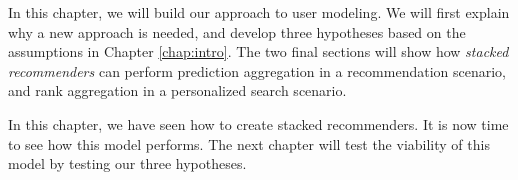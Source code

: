 \label{chap:methods}

In this chapter, we will build our approach to user modeling.
We will first explain why a new approach is needed,
and develop three hypotheses based on the 
assumptions in Chapter \ref{chap:intro}.
The two final sections will show how \emph{stacked recommenders}
can perform prediction aggregation in a recommendation scenario,
and rank aggregation in a personalized search scenario.







\hr

\noindent
In this chapter, we have seen how to create stacked recommenders.
It is now time to see how this model performs.
The next chapter will test the viability of this model
by testing our three hypotheses.
